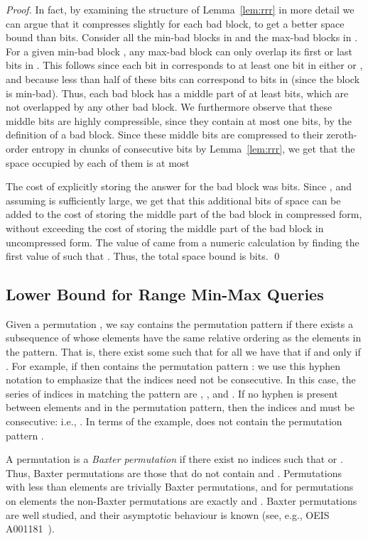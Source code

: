 \documentclass[runningheads]{llncs}
\begin{document}
\begin{proof}
In fact, by examining the structure of Lemma~\ref{lem:rrr} in more
detail we can argue that it compresses  slightly for each bad
block, to get a better space bound than  bits. Consider all
the min-bad blocks  in  and the
max-bad blocks  in .  For a
given min-bad block , any max-bad block  can only
overlap its first or last  bits in .  This follows since
each bit in  corresponds to at least one bit in either 
or , and because less than half of these  bits can
correspond to bits in  (since the block is min-bad). Thus,
each bad block has a middle part of at least  bits, which
are not overlapped by any other bad block.  We furthermore observe
that these  middle bits are highly compressible, since
they contain at most  one bits, by the definition of a bad
block.  Since these  middle bits are compressed to their
zeroth-order entropy in chunks of  consecutive bits
by Lemma~\ref{lem:rrr}, we get that the space occupied by each of them
is at most
 
\noindent
The cost of explicitly storing the answer for the bad block was  bits. Since , and assuming  is sufficiently large, we
get that this additional  bits of space can be added to the
cost of storing the middle part of the bad block in compressed form,
without exceeding the cost of storing the middle part of the bad block
in uncompressed form.  The value of  came from a numeric
calculation by finding the first value of  such that
.  Thus, the total space bound is
 bits.  \qed
\end{proof}

\subsection{Lower Bound for Range Min-Max Queries}

Given a permutation , we say  contains the
permutation pattern  if there
exists a subsequence of  whose elements have the same relative
ordering as the elements in the pattern.  That is, there exist some
 such that for all  we
have that  if and only if .  For
example, if  then  contains the permutation
pattern : we use this hyphen notation to
emphasize that the indices need not be consecutive. In this case, the
series of indices in  matching the pattern are , ,  and .  If no hyphen is present between elements
 and  in the permutation pattern, then the indices 
and  must be consecutive: i.e., .  In terms
of the example,  does not contain the permutation pattern
.

A permutation  is a \emph{Baxter permutation}
if there exist no indices  such that  or .
Thus, Baxter permutations are those that do not contain 
and .  Permutations with less than  elements are
trivially Baxter permutations, and for permutations on  elements
the non-Baxter permutations are exactly  and .
Baxter permutations are well studied, and their asymptotic behaviour
is known (see, e.g., OEIS A001181~\cite{OEIS}).
\end{document}
